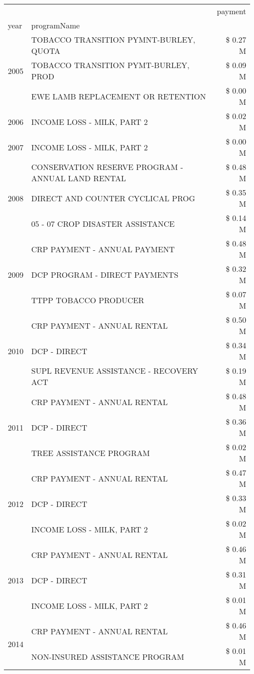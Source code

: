 \begin{tabular}{llr}
\toprule
 &  & payment \\
year & programName &  \\
\midrule
\multirow[t]{3}{*}{2005} & TOBACCO TRANSITION PYMNT-BURLEY, QUOTA & \$ 0.27 M \\
 & TOBACCO TRANSITION PYMT-BURLEY, PROD & \$ 0.09 M \\
 & EWE LAMB REPLACEMENT OR RETENTION & \$ 0.00 M \\
\cline{1-3}
2006 & INCOME LOSS - MILK, PART 2 & \$ 0.02 M \\
\cline{1-3}
2007 & INCOME LOSS - MILK, PART 2 & \$ 0.00 M \\
\cline{1-3}
\multirow[t]{3}{*}{2008} & CONSERVATION RESERVE PROGRAM - ANNUAL LAND RENTAL & \$ 0.48 M \\
 & DIRECT AND COUNTER CYCLICAL PROG & \$ 0.35 M \\
 & 05 - 07 CROP DISASTER ASSISTANCE & \$ 0.14 M \\
\cline{1-3}
\multirow[t]{3}{*}{2009} & CRP PAYMENT - ANNUAL PAYMENT & \$ 0.48 M \\
 & DCP PROGRAM - DIRECT PAYMENTS & \$ 0.32 M \\
 & TTPP TOBACCO PRODUCER & \$ 0.07 M \\
\cline{1-3}
\multirow[t]{3}{*}{2010} & CRP PAYMENT - ANNUAL RENTAL & \$ 0.50 M \\
 & DCP - DIRECT & \$ 0.34 M \\
 & SUPL REVENUE ASSISTANCE - RECOVERY ACT & \$ 0.19 M \\
\cline{1-3}
\multirow[t]{3}{*}{2011} & CRP PAYMENT - ANNUAL RENTAL & \$ 0.48 M \\
 & DCP - DIRECT & \$ 0.36 M \\
 & TREE ASSISTANCE PROGRAM & \$ 0.02 M \\
\cline{1-3}
\multirow[t]{3}{*}{2012} & CRP PAYMENT - ANNUAL RENTAL & \$ 0.47 M \\
 & DCP - DIRECT & \$ 0.33 M \\
 & INCOME LOSS - MILK, PART 2 & \$ 0.02 M \\
\cline{1-3}
\multirow[t]{3}{*}{2013} & CRP PAYMENT - ANNUAL RENTAL & \$ 0.46 M \\
 & DCP - DIRECT & \$ 0.31 M \\
 & INCOME LOSS - MILK, PART 2 & \$ 0.01 M \\
\cline{1-3}
\multirow[t]{3}{*}{2014} & CRP PAYMENT - ANNUAL RENTAL & \$ 0.46 M \\
 & NON-INSURED ASSISTANCE PROGRAM & \$ 0.01 M \\

\end{tabular}

